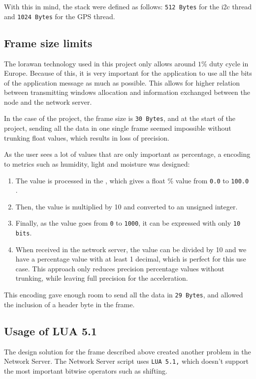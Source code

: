 With this in mind, the stack were defined as follows: \texttt{512 Bytes} for the \acrshort{i2c} thread and \texttt{1024 Bytes} for the GPS thread.

\subsection{Frame size limits}

The \acrshort{lorawan} technology used in this project only allows around $1\%$ duty cycle in Europe. Because of this, it is very important for the application to use all the bits of the application message as much as possible. This allows for higher relation between transmitting windows allocation and information exchanged between the node and the network server.

In the case of the project, the frame size is \texttt{30 Bytes}, and at the start of the project, sending all the data in one single frame seemed impossible without trunking float values, which results in loss of precision.

As the user sees a lot of values that are only important as percentage, a encoding to metrics such as humidity, light and moisture was designed:
\begin{enumerate}
    \item The value is processed in the , which gives a float \% value from \texttt{0.0} to \texttt{100.0} .
    \item Then, the value is multiplied by 10 and converted to an unsigned integer.
    \item Finally, as the value goes from \texttt{0} to \texttt{1000}, it can be expressed with only \texttt{10 bits}.
    \item When received in the network server, the value can be divided by 10 and we have a percentage value with at least 1 decimal, which is perfect for this use case. 
    This approach only reduces precision percentage values without trunking, while leaving full precision for the acceleration.
\end{enumerate}

This encoding gave enough room to send all the data in \texttt{29 Bytes}, and allowed the inclusion of a header byte in the frame.

\subsection{Usage of LUA 5.1}

The design solution for the frame described above created another problem in the Network Server. The Network Server script 
uses \texttt{LUA 5.1,} which doesn't support the most important bitwise operators\cite{luauserswikiBitwise} such as shifting.

